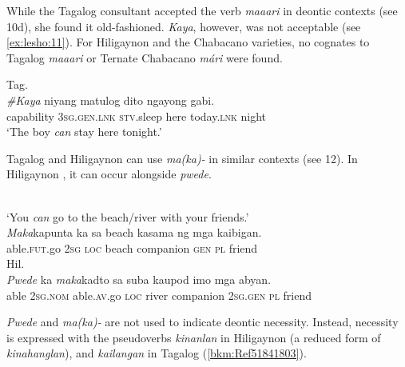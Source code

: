 \documentclass[output=paper,colorlinks,citecolor=brown]{langscibook}
\begin{document}
While the Tagalog consultant accepted the verb \textit{maaari} in deontic contexts (see 10d), she found it old-fashioned. \textit{Kaya}, however, was not acceptable (see \ref{ex:lesho:11}). For Hiligaynon and the Chabacano varieties, no cognates to Tagalog \textit{maaari} or Ternate Chabacano \textit{mári} were found.

\ea\label{ex:lesho:11}
{Tag.}\\
\gll \textit{\#Kaya} niyang matulog dito ngayong gabi.\\
capability 3\textsc{sg.gen.lnk} \textsc{stv}.sleep here today.\textsc{lnk} night\\
\glt `The boy \textit{can} stay here tonight.'\\
\z

Tagalog and Hiligaynon can use \textit{ma(ka)-} in similar contexts (see 12). In Hiligaynon , it can occur alongside \textit{pwede}.

\ea\label{ex:lesho:12}
\label{ex:lesho:12a}\\
{‘You \textit{can} go to the beach/river with your friends.’}\\
\gll \textit{Maka}kapunta ka sa beach kasama ng mga kaibigan.\\
     able.\textsc{fut}.go 2\textsc{sg} \textsc{loc} beach companion \textsc{gen} \textsc{pl} friend\\
\ex
{Hil.}\label{ex:lesho:12b}\\
\gll \textit{Pwede} ka \textit{maka}kadto sa suba kaupod imo mga abyan.\\
     able 2\textsc{sg.nom} able.\textsc{av}.go \textsc{loc} river companion 2\textsc{sg.gen} \textsc{pl} friend\\
\z
\z

\textit{Pwede} and \textit{ma(ka)-} are not used to indicate deontic necessity. Instead, necessity is expressed with the pseudoverbs \textit{kinanlan} in Hiligaynon (a reduced form of \textit{kinahanglan}), and \textit{kailangan} in Tagalog (\ref{bkm:Ref51841803}).\largerpage
\end{document}
